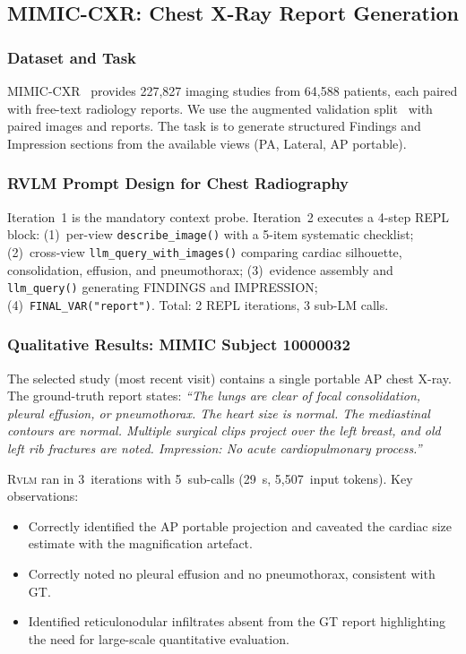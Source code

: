 \documentclass{article}
\newcommand{\RVLM}{\textsc{Rvlm}}
\begin{document}
	\subsection{MIMIC-CXR: Chest X-Ray Report Generation}
	\label{sec:mimic}
	
	\subsubsection*{Dataset and Task}
	
	MIMIC-CXR~\citep{johnson2019mimic} provides 227,827 imaging studies from
	64,588 patients, each paired with free-text radiology reports.
	We use the augmented validation split~\citep{mimic_aug} with paired images
	and reports.
	The task is to generate structured Findings and Impression sections from the
	available views (PA, Lateral, AP portable).
	
	\subsubsection*{RVLM Prompt Design for Chest Radiography}
	
	Iteration~1 is the mandatory context probe.
	Iteration~2 executes a 4-step REPL block:
	(1)~per-view \texttt{describe\_image()} with a 5-item systematic checklist;
	(2)~cross-view \texttt{llm\_query\_with\_images()} comparing cardiac
	silhouette, consolidation, effusion, and pneumothorax;
	(3)~evidence assembly and \texttt{llm\_query()} generating FINDINGS and
	IMPRESSION;
	(4)~\texttt{FINAL\_VAR("report")}.
	Total: 2 REPL iterations, 3 sub-LM calls.
	
	\subsubsection*{Qualitative Results: MIMIC Subject 10000032}
	
	The selected study (most recent visit) contains a single portable AP chest
	X-ray.
	The ground-truth report states: \textit{``The lungs are clear of focal
		consolidation, pleural effusion, or pneumothorax. The heart size is normal.
		The mediastinal contours are normal. Multiple surgical clips project over the
		left breast, and old left rib fractures are noted. Impression: No acute
		cardiopulmonary process.''}
	
	\RVLM{} ran in 3~iterations with 5~sub-calls (29~s, 5,507~input tokens).
	Key observations:
	\begin{itemize}[nosep]
		\item Correctly identified the AP portable projection and caveated the
		cardiac size estimate with the magnification artefact.
		\item Correctly noted no pleural effusion and no pneumothorax,
		consistent with GT.
		\item Identified reticulonodular infiltrates absent from the GT report highlighting the need for large-scale quantitative evaluation.
	\end{itemize}
	
\end{document}
